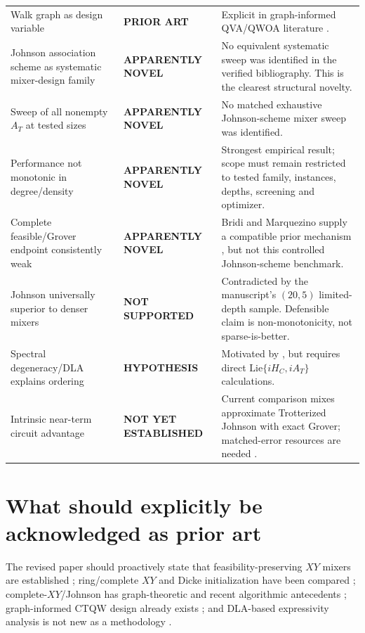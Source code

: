 \documentclass[11pt]{article}
\newcommand{\prior}{\textcolor{critical}{\textbf{PRIOR ART}}}
\newcommand{\novel}{\textcolor{newgreen}{\textbf{APPARENTLY NOVEL}}}
\begin{document}
\begin{longtable}{p{}p{}p{}}
Walk graph as design variable & \prior & Explicit in graph-informed QVA/QWOA literature \cite{Matwiejew2024,Marsh2019,Marsh2020}.\\
Johnson association scheme as systematic mixer-design family & \novel & No equivalent systematic sweep was identified in the verified bibliography. This is the clearest structural novelty.\\
Sweep of all nonempty $A_T$ at tested sizes & \novel & No matched exhaustive Johnson-scheme mixer sweep was identified.\\
Performance not monotonic in degree/density & \novel & Strongest empirical result; scope must remain restricted to tested family, instances, depths, screening and optimizer.\\
Complete feasible/Grover endpoint consistently weak & \novel & Bridi and Marquezino supply a compatible prior mechanism \cite{Bridi2024}, but not this controlled Johnson-scheme benchmark.\\
Johnson universally superior to denser mixers & \textbf{NOT SUPPORTED} & Contradicted by the manuscript's $(20,5)$ limited-depth sample. Defensible claim is non-monotonicity, not sparse-is-better.\\
Spectral degeneracy/DLA explains ordering & \textbf{HYPOTHESIS} & Motivated by \cite{Bridi2026Expressivity,Kordonowy2026}, but requires direct $\mathrm{Lie}\{iH_C,iA_T\}$ calculations.\\
Intrinsic near-term circuit advantage & \textbf{NOT YET ESTABLISHED} & Current comparison mixes approximate Trotterized Johnson with exact Grover; matched-error resources are needed \cite{He2023,Awasthi2026Trotter}.\\
\bottomrule
\end{longtable}

\section{What should explicitly be acknowledged as prior art}
The revised paper should proactively state that feasibility-preserving $XY$ mixers are established \cite{Hadfield2019,Wang2020,Fuchs2022}; ring/complete $XY$ and Dicke initialization have been compared \cite{Cook2019,He2023}; complete-$XY$/Johnson has graph-theoretic and recent algorithmic antecedents \cite{FabilaMonroy2012Token,MinSeoHeo2026}; graph-informed CTQW design already exists \cite{Matwiejew2024}; and DLA-based expressivity analysis is not new as a methodology \cite{Bridi2026Expressivity,Kordonowy2026}.
\end{document}
